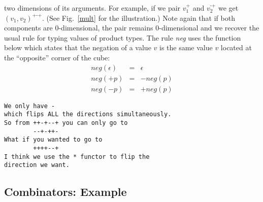 \documentclass[authoryear,preprint]{sigplanconf}
\newcommand{\mm}{\texttt{-}}
\newcommand{\pp}{\texttt{+}}
\newcommand{\negp}[1]{\textit{neg}(#1)}
\begin{document}
two dimensions of its arguments. For example, if we pair $v_1^{\pp}$ and
$v_2^{\mm\pp}$ we get $(v_1,v_2)^{\pp\mm\pp}$. (See Fig.~\ref{mult} for the
illustration.) Note again that if both components are 0-dimensional, the pair
remains 0-dimensional and we recover the usual rule for typing values of
product types. The rule \textit{neg} uses the function below which states
that the negation of a value $v$ is the same value $v$ located at the
``opposite'' corner of the cube:
\[\begin{array}{rcl}
\negp{\epsilon} &=& \epsilon \\
\negp{+p} &=& -\negp{p} \\
\negp{-p} &=& +\negp{p}
\end{array}\]

\begin{verbatim}
We only have -
which flips ALL the directions simultaneously.
So from ++-+--+ you can only go to
        --+-++-
What if you wanted to go to
        ++++--+
I think we use the * functor to flip the 
direction we want. 
\end{verbatim}

\subsection{Combinators: Example} 
\end{document}
